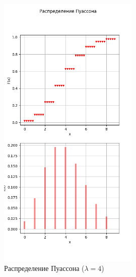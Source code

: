 \begin{figure}[!htb]\centering
	\includegraphics[width=0.6\textwidth]{../img/poisson.png}
	\caption{Распределение Пуассона ($\lambda = 4$)}
	\label{img:poisson}
\end{figure}
